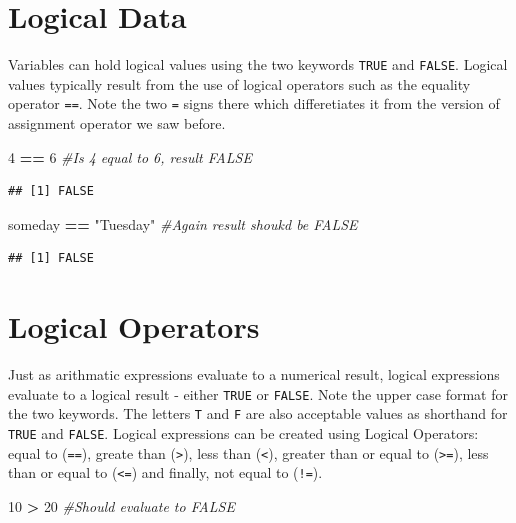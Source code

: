 \documentclass[]{krantz}
\makeatletter
\newenvironment{Shaded}{\begin{snugshade}}{\end{snugshade}}
\newcommand{\DecValTok}[1]{\textcolor[rgb]{0.06,0.06,0.06}{#1}}
\newcommand{\StringTok}[1]{\textcolor[rgb]{0.5,0.5,0.5}{#1}}
\newcommand{\CommentTok}[1]{\textcolor[rgb]{0.56,0.35,0.01}{\textit{#1}}}
\newcommand{\OperatorTok}[1]{\textcolor[rgb]{0.81,0.36,0.00}{\textbf{#1}}}
\newcommand{\NormalTok}[1]{#1}
\newenvironment{kframe}{%
\medskip{}
\setlength{\fboxsep}{.8em}
 \def\at@end@of@kframe{}%
 \ifinner\ifhmode%
  \def\at@end@of@kframe{\end{minipage}}%
  \begin{minipage}{\columnwidth}%
 \fi\fi%
 \def\FrameCommand##1{\hskip\@totalleftmargin \hskip-\fboxsep
 \colorbox{shadecolor}{##1}\hskip-\fboxsep
     \hskip-\linewidth \hskip-\@totalleftmargin \hskip\columnwidth}%
 \MakeFramed {\advance\hsize-\width
   \@totalleftmargin\z@ \linewidth\hsize
   \@setminipage}}%
 {\par\unskip\endMakeFramed%
 \at@end@of@kframe}
\renewenvironment{Shaded}{\begin{kframe}}{\end{kframe}}
\theoremstyle{definition}
\theoremstyle{definition}
\theoremstyle{definition}
\theoremstyle{remark}
\makeatother
\begin{document}
\section{Logical Data}\label{logical-data}

Variables can hold logical values using the two keywords \texttt{TRUE}
and \texttt{FALSE}. Logical values typically result from the use of
logical operators such as the equality operator \texttt{==}. Note the
two \texttt{=} signs there which differetiates it from the version of
assignment operator we saw before.

\begin{Shaded}
\begin{Highlighting}[]
\DecValTok{4} \OperatorTok{==}\StringTok{ }\DecValTok{6} \CommentTok{#Is 4 equal to 6, result FALSE}
\end{Highlighting}
\end{Shaded}

\begin{verbatim}
## [1] FALSE
\end{verbatim}

\begin{Shaded}
\begin{Highlighting}[]
\NormalTok{someday }\OperatorTok{==}\StringTok{ "Tuesday"} \CommentTok{#Again result shoukd be FALSE}
\end{Highlighting}
\end{Shaded}

\begin{verbatim}
## [1] FALSE
\end{verbatim}

\section{Logical Operators}\label{logical-operators}

Just as arithmatic expressions evaluate to a numerical result, logical
expressions evaluate to a logical result - either \texttt{TRUE} or
\texttt{FALSE}. Note the upper case format for the two keywords. The
letters \texttt{T} and \texttt{F} are also acceptable values as
shorthand for \texttt{TRUE} and \texttt{FALSE}. Logical expressions can
be created using Logical Operators: equal to (\texttt{==}), greate than
(\texttt{\textgreater{}}), less than (\texttt{\textless{}}), greater
than or equal to (\texttt{\textgreater{}=}), less than or equal to
(\texttt{\textless{}=}) and finally, not equal to (\texttt{!=}).

\begin{Shaded}
\begin{Highlighting}[]
\DecValTok{10} \OperatorTok{>}\StringTok{ }\DecValTok{20} \CommentTok{#Should evaluate to FALSE}
\end{Highlighting}
\end{Shaded}
\end{document}

